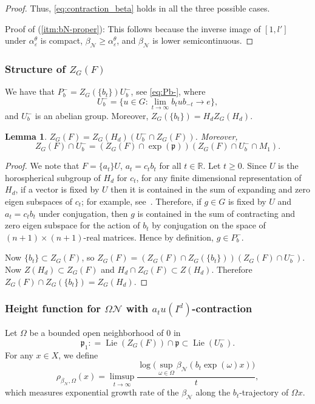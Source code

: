 \documentclass[12pt,reqno]{amsart}
\newcommand{\defeq}{\mathrel{\mathop:}=}
\numberwithin{equation}{section}
\theoremstyle{plain}
\newtheorem{lem}[thm]{Lemma}
\theoremstyle{definition}
\theoremstyle{remark}
\newcommand\cN{\mathcal{N}}
\newcommand\fp{\mathfrak{p}}
\newcommand{\R}{\mathbb{R}}
\newcommand{\eps}{\varepsilon}
\newcommand{\bN}{\beta_\cN}
\DeclareMathOperator{\Lie}{Lie}
\begin{document}
\begin{proof}
        Thus,  \eqref{eq:contraction_beta} holds in all the three possible cases.

        Proof of (\ref{itm:bN-proper}): This follows because the inverse image of $[1,l']$ under $\alpha_\eps^\theta$ is compact, $\bN\geq \alpha_\eps^{\theta}$, and $\bN$ is lower semicontinuous. 
    \end{proof}

\subsubsection{Structure of $Z_G(F)$}
We have that $P_b^-=Z_G(\{b_t\})U_b^-$, see \eqref{eq:Pb-}, where 
    \begin{equation}
    \label{eq:U-}
    U^-_b=\{u\in G: \lim_{t\to\infty} b_tub_{-t}\to e\},
    \end{equation}
    and $U_b^-$ is an abelian group. 
 Moreover, $Z_G(\{b_t\})=H_dZ_G(H_d)$. 

\begin{lem} \label{lem:ZGF-Pb-}
   $Z_G(F)=Z_G(H_d)(U_b^-\cap Z_G(F))$. Moreover,
   \[
   Z_G(F)\cap U_b^-=(Z_G(F)\cap\exp(\fp))(Z_G(F)\cap U_b^-\cap M_1).
   \]
\end{lem} 

\begin{proof}
    We note that $F=\{a_t\}U$, $a_t=c_tb_t$ for all $t\in\R$. Let $t\geq 0$. Since $U$ is the horospherical subgroup of $H_d$ for $c_t$, for any finite dimensional representation of $H_d$, if a vector is fixed by $U$ then it is contained in the sum of expanding and zero eigen subspaces of $c_t$; for example, see~\cite[Lemma~5.2]{Shah-horo}. Therefore, if $g\in G$ is fixed by $U$ and $a_t=c_tb_t$ under conjugation, then $g$ is contained in the sum of contracting and zero eigen subspace for the action of $b_t$ by conjugation on the space of $(n+1)\times(n+1)$-real matrices. Hence by definition, $g\in P_b^-$.

    Now $\{b_t\}\subset Z_G(F)$, so $Z_G(F)=(Z_G(F)\cap Z_G(\{b_t\}))(Z_G(F)\cap U_b^-)$. Now $Z(H_d)\subset Z_G(F)$ and $H_d\cap Z_G(F)\subset Z(H_d)$. Therefore $Z_G(F)\cap Z_G(\{b_t\})=Z_G(H_d)$. 
\end{proof}

\subsubsection{Height function for \texorpdfstring{$\Omega\cN$}{} with \texorpdfstring{$a_tu(I^d)$}{a\textsubscript t u(I\textsuperscript d)}-contraction}
    Let $\Omega$ be a bounded open neighborhood of $0$ in \[
    \fp_1\defeq \Lie(Z_G(F))\cap \fp\subset \Lie(U_b^{-}).
    \]
    For any $x\in X$, we define 
	\begin{equation} \label{eq:definition of beta_N exponent}
	\rho_{\bN,\Omega}(x)=\limsup_{t\to\infty}\frac{\log \bigl(\sup_{\omega\in\Omega}\bN(b_t\exp(\omega) x)\bigr)}{t},
	\end{equation}
which measures exponential growth rate of the $\bN$ along the $b_t$-trajectory of $\Omega x$. 
\end{document}
